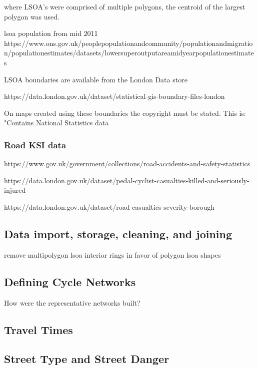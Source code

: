 \documentclass[11pt]{article} %
\begin{document}
where LSOA's were comprised of multiple polygons, the centroid of the largest polygon was used. 

lsoa population from mid 2011 
https://www.ons.gov.uk/peoplepopulationandcommunity/populationandmigration/populationestimates/datasets/lowersuperoutputareamidyearpopulationestimates

LSOA boundaries are available from the London Data store

https://data.london.gov.uk/dataset/statistical-gis-boundary-files-london

On maps created using these boundaries the copyright must be stated. This is: "Contains National Statistics data %

\subsubsection{Road KSI data}

https://www.gov.uk/government/collections/road-accidents-and-safety-statistics

https://data.london.gov.uk/dataset/pedal-cyclist-casualties-killed-and-seriously-injured

https://data.london.gov.uk/dataset/road-casualties-severity-borough

\subsection{Data import, storage, cleaning, and joining}

remove multipolygon lsoa interior rings in favor of polygon lsoa shapes

\subsection{Defining Cycle Networks}

How were the representative networks built? 

\subsection{Travel Times}

\subsection{Street Type and Street Danger}
\end{document}
